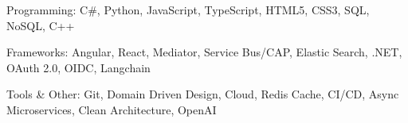 \vspace{-1\baselineskip}
\begin{cvskills}
  \cvskill
    {Programming:} %
    {C\#, Python, JavaScript, TypeScript, HTML5, CSS3, SQL, NoSQL, C++} %

  \cvskill
    {Frameworks:} %
    {Angular, React, Mediator, Service Bus/CAP, Elastic Search, .NET, OAuth 2.0, OIDC, Langchain} %

  \cvskill
    {Tools \& Other:} %
    {Git, Domain Driven Design, Cloud, Redis Cache, CI/CD, Async Microservices, Clean Architecture, OpenAI} %

\end{cvskills}
\vspace{-0.5\baselineskip}